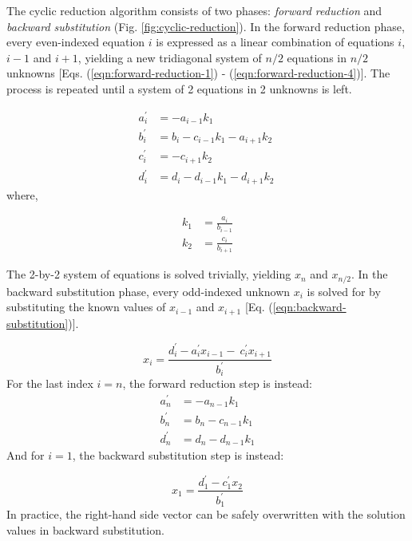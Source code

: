 The cyclic reduction algorithm consists of two phases:
\emph{forward reduction} and \emph{backward substitution}
(Fig. \ref{fig:cyclic-reduction}).
In the forward reduction phase,
every even-indexed equation $i$
is expressed as a
linear combination of equations $i$, $i-1$ and $i+1$,
yielding a new tridiagonal system of
$n/2$ equations in $n/2$ unknowns
[Eqs. (\ref{eqn:forward-reduction-1}) - (\ref{eqn:forward-reduction-4})].
The process is repeated until a system of
2 equations in 2 unknowns is left.

\begin{align} 
    a^{\prime}_i &= -a_{i-1}k_1 \
    \label{eqn:forward-reduction-1} \\
    b^{\prime}_i &= b_i - c_{i-1}k_1 - a_{i+1}k_2 \
    \label{eqn:forward-reduction-2} \\
    c^{\prime}_i &= -c_{i+1}k_2 \
    \label{eqn:forward-reduction-3} \\
    d^{\prime}_i &= d_i - d_{i-1}k_1  - d_{i+1}k_2 \
    \label{eqn:forward-reduction-4}
\end{align}
%
where,

\begin{align}
    k_1 &= \frac{a_i}{b_{i-1}} \label{eqn:k1-update} \\
    k_2 &= \frac{c_i}{b_{i+1}} \label{eqn:k2-update}
\end{align}

The 2-by-2 system of equations is solved trivially,
yielding $x_n$ and $x_{n/2}$.
In the backward substitution phase,
every odd-indexed unknown $x_i$ is solved for by
substituting the known values of $x_{i-1}$ and $x_{i+1}$
[Eq. (\ref{eqn:backward-substitution})].

\begin{equation} \label{eqn:backward-substitution}
x_i = \frac{d^{\prime}_i - a^{\prime}_ix_{i-1} - \
    c^{\prime}_ix_{i+1}}{b^{\prime}_i}
\end{equation}
%
For the last index $i=n$,
the forward reduction step is instead:
\begin{align} \label{eqn:forward-reduction-last}
    a^{\prime}_n &= -a_{n-1}k_1  \\
    b^{\prime}_n &= b_n - c_{n-1}k_1  \\
    d^{\prime}_n &= d_n - d_{n-1}k_1
\end{align}
%
And for $i=1$, the backward substitution step is instead:

\begin{equation} \label{eqn:backward-substitution-first}
x_1 = \frac{d^{\prime}_1 - c^{\prime}_1x_{2}}{b^{\prime}_1}
\end{equation}
%
In practice, the right-hand side vector can be safely
overwritten with the solution values
in backward substitution.

